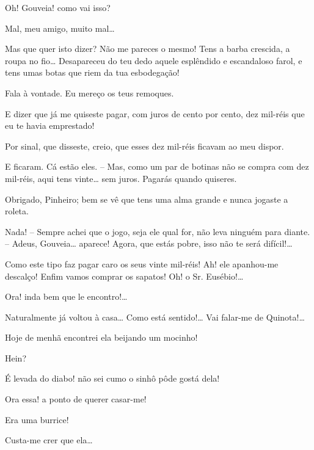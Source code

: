   Oh! Gouveia! como vai isso?

 Mal, meu amigo, muito mal\ldots{}

 Mas que quer isto dizer? Não me pareces o mesmo! Tens a barba
crescida, a roupa no fio\ldots{} Desapareceu do teu dedo aquele esplêndido e 
escandaloso farol, e tens umas botas que riem da tua esbodegação!

 Fala à vontade. Eu mereço os teus remoques.

 E dizer que já me quiseste pagar, com juros de cento por cento,
dez mil-réis que eu te havia emprestado!

 Por sinal, que disseste, creio, que esses dez mil-réis ficavam ao
meu dispor.

 E ficaram.  Cá estão eles. -- Mas,
como um par de botinas não se compra com dez mil-réis, aqui tens vinte\ldots{} sem
juros. Pagarás quando quiseres.

 Obrigado, Pinheiro; bem se vê que tens uma alma grande e nunca 
jogaste a roleta.

 Nada! -- Sempre achei que o jogo, seja ele qual for, não leva
ninguém para diante. -- Adeus, Gouveia\ldots{} aparece! Agora, que estás pobre, isso não
te será difícil!\ldots{} 


 Como este tipo faz pagar caro os seus vinte mil-réis! Ah! ele
apanhou-me descalço! Enfim vamos comprar os sapatos!  Oh! o Sr. Eusébio!\ldots{}

 Ora! inda bem que le encontro!\ldots{}

  Naturalmente já voltou à casa\ldots{} Como está sentido!\ldots{}
Vai falar-me de Quinota!\ldots{}

 Hoje de menhã encontrei ela beijando um mocinho!

 Hein?

 É levada do diabo! não sei cumo o sinhô pôde gostá dela!

 Ora essa! a ponto de querer casar-me!

 Era uma burrice!

 Custa-me crer que ela\ldots{}

